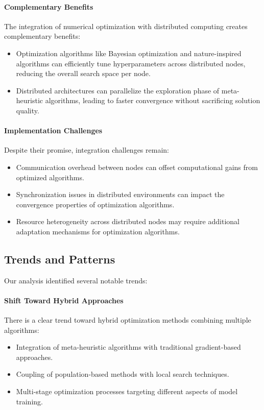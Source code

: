\paragraph{Complementary Benefits}
The integration of numerical optimization with distributed computing creates complementary benefits:
\begin{itemize}
    \item Optimization algorithms like Bayesian optimization and nature-inspired algorithms can efficiently tune hyperparameters across distributed nodes, reducing the overall search space per node.
    
    \item Distributed architectures can parallelize the exploration phase of meta-heuristic algorithms, leading to faster convergence without sacrificing solution quality.
\end{itemize}

\paragraph{Implementation Challenges}
Despite their promise, integration challenges remain:
\begin{itemize}
    \item Communication overhead between nodes can offset computational gains from optimized algorithms.
    
    \item Synchronization issues in distributed environments can impact the convergence properties of optimization algorithms.
    
    \item Resource heterogeneity across distributed nodes may require additional adaptation mechanisms for optimization algorithms.
\end{itemize}

\subsection{Trends and Patterns}
Our analysis identified several notable trends:

\paragraph{Shift Toward Hybrid Approaches}
There is a clear trend toward hybrid optimization methods combining multiple algorithms:
\begin{itemize}
    \item Integration of meta-heuristic algorithms with traditional gradient-based approaches.
    
    \item Coupling of population-based methods with local search techniques.
    
    \item Multi-stage optimization processes targeting different aspects of model training.
\end{itemize}

